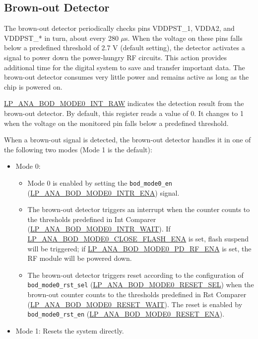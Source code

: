 \documentclass[main\_\_EN.tex]{subfiles}
\begin{document}
\subsection{Brown-out Detector}

The brown-out detector periodically checks pins VDDPST\_1, VDDA2, and VDDPST\_* in turn, about every 280 $\mu$s. When the voltage on these pins falls below a predefined threshold of 2.7 V (default setting), the detector activates a signal to power down the power-hungry RF circuits. This action provides additional time for the digital system to save and transfer important data. The brown-out detector consumes very little power and remains active as long as the chip is powered on.

\hyperref[fielddesc:LPANABODMODE0INTRAW]{LP\_ANA\_BOD\_MODE0\_INT\_RAW} indicates the detection result from the brown-out detector. By default, this register reads a value of 0. It changes to 1 when the voltage on the monitored pin falls below a predefined threshold.

When a brown-out signal is detected, the brown-out detector handles it in one of the following two modes (Mode 1 is the default):

\begin{itemize}
    \item Mode 0:
    \begin{itemize}
        \item Mode 0 is enabled by setting the \texttt{bod\_mode0\_en} (\hyperref[fielddesc:LPANABODMODE0INTRENA]{LP\_ANA\_BOD\_MODE0\_INTR\_ENA}) signal.
        \item The brown-out detector triggers an interrupt when the counter counts to the thresholds predefined in Int Comparer (\hyperref[fielddesc:LPANABODMODE0INTRWAIT]{LP\_ANA\_BOD\_MODE0\_INTR\_WAIT}). If \hyperref[fielddesc:LPANABODMODE0CLOSEFLASHENA]{LP\_ANA\_BOD\_MODE0\_CLOSE\_FLASH\_ENA} is set, flash suspend will be triggered; if \hyperref[fielddesc:LPANABODMODE0PDRFENA]{LP\_ANA\_BOD\_MODE0\_PD\_RF\_ENA} is set, the RF module will be powered down.
        \item The brown-out detector triggers reset according to the configuration of \texttt{bod\_mode0\_rst\_sel} (\hyperref[fielddesc:LPANABODMODE0RESETSEL]{LP\_ANA\_BOD\_MODE0\_RESET\_SEL}) when the brown-out counter counts to the thresholds predefined in Rst Comparer (\hyperref[fielddesc:LPANABODMODE0RESETWAIT]{LP\_ANA\_BOD\_MODE0\_RESET\_WAIT}). The reset is enabled by \texttt{bod\_mode0\_rst\_en} (\hyperref[fielddesc:LPANABODMODE0RESETENA]{LP\_ANA\_BOD\_MODE0\_RESET\_ENA}).
    \end{itemize}

    \item Mode 1: Resets the system directly.
\end{itemize}
\end{document}
